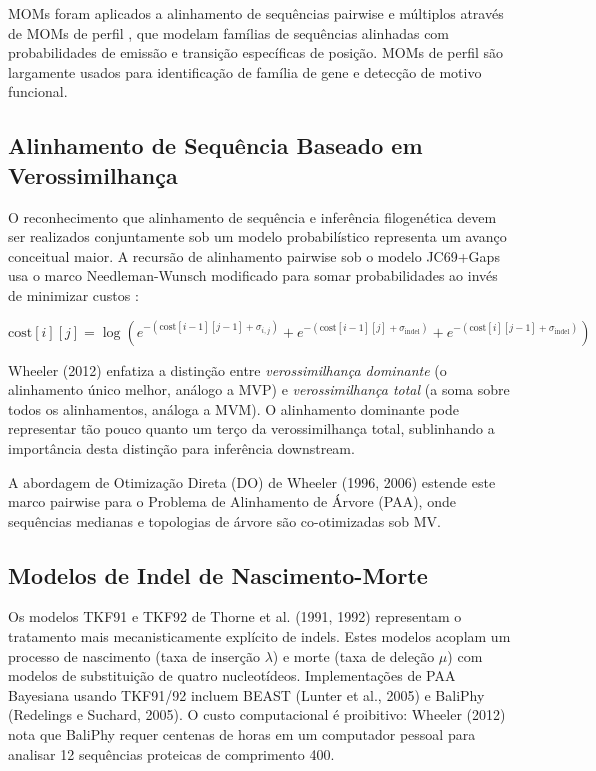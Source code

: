 MOMs foram aplicados a alinhamento de sequências pairwise e múltiplos através de MOMs de perfil \parencite{krogh1994}, que modelam famílias de sequências alinhadas com probabilidades de emissão e transição específicas de posição. MOMs de perfil são largamente usados para identificação de família de gene e detecção de motivo funcional.

\subsection{Alinhamento de Sequência Baseado em Verossimilhança}

O reconhecimento que alinhamento de sequência e inferência filogenética devem ser realizados conjuntamente sob um modelo probabilístico representa um avanço conceitual maior. A recursão de alinhamento pairwise sob o modelo JC69+Gaps usa o marco Needleman-Wunsch modificado para somar probabilidades ao invés de minimizar custos \parencite{wheeler2012}:

$$\mathrm{cost}[i][j] = \log\left( e^{-(\mathrm{cost}[i-1][j-1] + \sigma_{i,j})} + e^{-(\mathrm{cost}[i-1][j] + \sigma_{\mathrm{indel}})} + e^{-(\mathrm{cost}[i][j-1] + \sigma_{\mathrm{indel}})} \right)$$

Wheeler (2012) enfatiza a distinção entre \textit{verossimilhança dominante} (o alinhamento único melhor, análogo a MVP) e \textit{verossimilhança total} (a soma sobre todos os alinhamentos, análoga a MVM). O alinhamento dominante pode representar tão pouco quanto um terço da verossimilhança total, sublinhando a importância desta distinção para inferência downstream.

A abordagem de Otimização Direta (DO) de Wheeler (1996, 2006) estende este marco pairwise para o Problema de Alinhamento de Árvore (PAA), onde sequências medianas e topologias de árvore são co-otimizadas sob MV.

\subsection{Modelos de Indel de Nascimento-Morte}

Os modelos TKF91 e TKF92 de Thorne et al. (1991, 1992) representam o tratamento mais mecanisticamente explícito de indels. Estes modelos acoplam um processo de nascimento (taxa de inserção $\lambda$) e morte (taxa de deleção $\mu$) com modelos de substituição de quatro nucleotídeos. Implementações de PAA Bayesiana usando TKF91/92 incluem BEAST (Lunter et al., 2005) e BaliPhy (Redelings e Suchard, 2005). O custo computacional é proibitivo: Wheeler (2012) nota que BaliPhy requer centenas de horas em um computador pessoal para analisar 12 sequências proteicas de comprimento 400.

